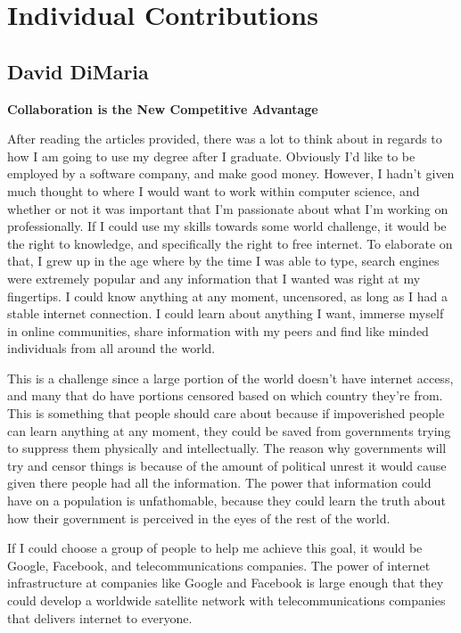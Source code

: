 \documentclass[12pt,letterpaper]{article}
\begin{document}
\clearpage
\section{Individual Contributions}
\clearpage
\subsection*{David DiMaria}
\textbf{Collaboration is the New Competitive Advantage}

After reading the articles provided, there was a lot to think about in regards to how I am going to use my degree after I graduate. Obviously I’d like to be employed by a software company, and make good money. However, I hadn’t given much thought to where I would want to work within computer science, and whether or not it was important that I’m passionate about what I’m working on professionally. If I could use my skills towards some world challenge, it would be the right to knowledge, and specifically the right to free internet. To elaborate on that, I grew up in the age where by the time I was able to type, search engines were extremely popular and any information that I wanted was right at my fingertips. I could know anything at any moment, uncensored, as long as I had a stable internet connection. I could learn about anything I want, immerse myself in online communities, share information with my peers and find like minded individuals from all around the world.\par

This is a challenge since a large portion of the world doesn’t have internet access, and many that do have portions censored based on which country they're from. This is something that people should care about because if impoverished people can learn anything at any moment, they could be saved from governments trying to suppress them physically and intellectually. The reason why governments will try and censor things is because of the amount of political unrest it would cause given there people had all the information. The power that information could have on a population is unfathomable, because they could learn the truth about how their government is perceived in the eyes of the rest of the world.\par

If I could choose a group of people to help me achieve this goal, it would be Google, Facebook, and telecommunications companies. The power of internet infrastructure at companies like Google and Facebook is large enough that they could develop a worldwide satellite network with telecommunications companies that delivers internet to everyone.
\end{document}
